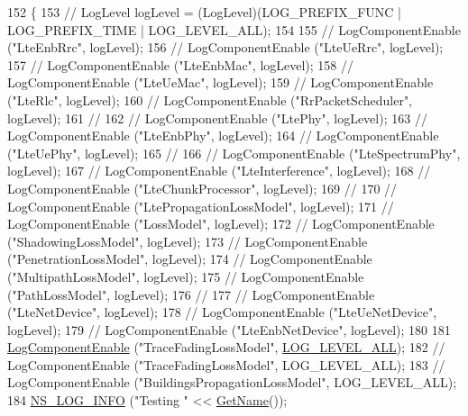 \begin{DoxyCode}
152 \{
153   \textcolor{comment}{//   LogLevel logLevel = (LogLevel)(LOG\_PREFIX\_FUNC | LOG\_PREFIX\_TIME | LOG\_LEVEL\_ALL);}
154   
155   \textcolor{comment}{//   LogComponentEnable ("LteEnbRrc", logLevel);}
156   \textcolor{comment}{//   LogComponentEnable ("LteUeRrc", logLevel);}
157   \textcolor{comment}{//   LogComponentEnable ("LteEnbMac", logLevel);}
158   \textcolor{comment}{//   LogComponentEnable ("LteUeMac", logLevel);}
159   \textcolor{comment}{//   LogComponentEnable ("LteRlc", logLevel);}
160   \textcolor{comment}{//   LogComponentEnable ("RrPacketScheduler", logLevel);}
161   \textcolor{comment}{// }
162   \textcolor{comment}{//   LogComponentEnable ("LtePhy", logLevel);}
163   \textcolor{comment}{//   LogComponentEnable ("LteEnbPhy", logLevel);}
164   \textcolor{comment}{//   LogComponentEnable ("LteUePhy", logLevel);}
165   \textcolor{comment}{// }
166   \textcolor{comment}{//   LogComponentEnable ("LteSpectrumPhy", logLevel);}
167   \textcolor{comment}{//   LogComponentEnable ("LteInterference", logLevel);}
168   \textcolor{comment}{//   LogComponentEnable ("LteChunkProcessor", logLevel);}
169   \textcolor{comment}{// }
170   \textcolor{comment}{//   LogComponentEnable ("LtePropagationLossModel", logLevel);}
171   \textcolor{comment}{//   LogComponentEnable ("LossModel", logLevel);}
172   \textcolor{comment}{//   LogComponentEnable ("ShadowingLossModel", logLevel);}
173   \textcolor{comment}{//   LogComponentEnable ("PenetrationLossModel", logLevel);}
174   \textcolor{comment}{//   LogComponentEnable ("MultipathLossModel", logLevel);}
175   \textcolor{comment}{//   LogComponentEnable ("PathLossModel", logLevel);}
176   \textcolor{comment}{// }
177   \textcolor{comment}{//   LogComponentEnable ("LteNetDevice", logLevel);}
178   \textcolor{comment}{//   LogComponentEnable ("LteUeNetDevice", logLevel);}
179   \textcolor{comment}{//   LogComponentEnable ("LteEnbNetDevice", logLevel);}
180   
181   \hyperlink{namespacens3_adc4ef4f00bb2f5f4edae67fc3bc27f20}{LogComponentEnable} (\textcolor{stringliteral}{"TraceFadingLossModel"}, \hyperlink{namespacens3_aa6464a4d69551a9cc968e17a65f39bdba022b1237a4fd1b08d034471df3c58586}{LOG\_LEVEL\_ALL});
182 \textcolor{comment}{//   LogComponentEnable ("TraceFadingLossModel", LOG\_LEVEL\_ALL);}
183 \textcolor{comment}{//   LogComponentEnable ("BuildingsPropagationLossModel", LOG\_LEVEL\_ALL);}
184   \hyperlink{group__logging_gafbd73ee2cf9f26b319f49086d8e860fb}{NS\_LOG\_INFO} (\textcolor{stringliteral}{"Testing "} << \hyperlink{classns3_1_1TestCase_a28f7bb59669c24dae1c290fc17fc9b62}{GetName}());

\end{DoxyCode}
